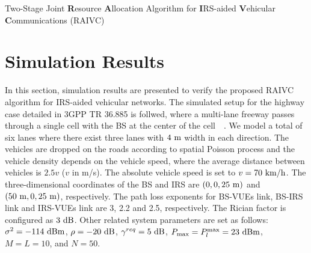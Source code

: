 \documentclass[journal]{IEEEtran}
\begin{document}
\begin{algorithm}[t]
	\caption{Two-Stage Joint \textbf{R}esource \textbf{A}llocation Algorithm for \textbf{I}RS-aided \textbf{V}ehicular \textbf{C}ommunications (RAIVC)}
	\begin{algorithmic}[1]
		\REPEAT
	\end{algorithmic}
\end{algorithm}

\section{Simulation Results}
In this section, simulation results are presented to verify the proposed RAIVC algorithm for IRS-aided vehicular networks. The simulated setup for the highway case detailed in 3GPP TR 36.885 is follwed, where a multi-lane freeway passes through a single cell with the BS at the center of the cell~\cite{3GPP}~\cite{Simulation}. We model a total of six lanes where there exist three lanes with $4\  \rm{m}$ width in each direction. The vehicles are dropped on the roads according to spatial Poisson process and the vehicle density depends on  the vehicle speed, where the average distance between vehicles is $2.5v$ ($v$ in m/s). The absolute vehicle speed is set to $v=70\ \rm{km/h}$. The three-dimensional coordinates of the BS and IRS are $ \left( {0,0,25\ {\rm{m}}} \right) $ and $ \left( {50\ {\rm{m}},0,25\ {\rm{m}}} \right) $, respectively. The path loss exponents for BS-VUEs link, BS-IRS
link and IRS-VUEs link are 3, 2.2 and 2.5, respectively. The Rician factor is configured as $3\ \rm{dB}$. Other related system parameters are set as follows: $ {\sigma ^2} =  - 114 \ {\rm{dBm}} $, $ \rho  =  - 20\ {\rm{dB}} $, ${\gamma ^{req}} = 5\ {\rm{dB}}$, $ {P_{\max }} = P_l^{\max } = 23\ {\rm{dBm}} $, $M = L = 10$, and $N=50$.
\end{document}
